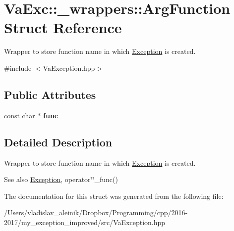 \hypertarget{struct_va_exc_1_1__wrappers_1_1_arg_function}{}\section{Va\+Exc\+:\+:\+\_\+wrappers\+:\+:Arg\+Function Struct Reference}
\label{struct_va_exc_1_1__wrappers_1_1_arg_function}


Wrapper to store function name in which \hyperlink{class_va_exc_1_1_exception}{Exception} is created.  




{\ttfamily \#include $<$Va\+Exception.\+hpp$>$}

\subsection*{Public Attributes}
\begin{DoxyCompactItemize}
\item 
\mbox{\label{struct_va_exc_1_1__wrappers_1_1_arg_function_a0a17c88352f57faf0778984410b9103f}} 
const char $\ast$ {\bfseries func}
\end{DoxyCompactItemize}


\subsection{Detailed Description}
Wrapper to store function name in which \hyperlink{class_va_exc_1_1_exception}{Exception} is created. 

\begin{DoxySeeAlso}{See also}
\hyperlink{class_va_exc_1_1_exception}{Exception}, operator\char`\"{}\char`\"{}\+\_\+func() 
\end{DoxySeeAlso}


The documentation for this struct was generated from the following file\+:\begin{DoxyCompactItemize}
\item 
/\+Users/vladislav\+\_\+aleinik/\+Dropbox/\+Programming/cpp/2016-\/2017/my\+\_\+exception\+\_\+improved/src/Va\+Exception.\+hpp\end{DoxyCompactItemize}
